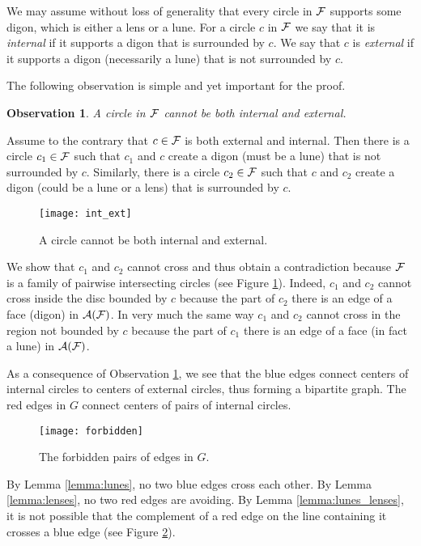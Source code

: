 \documentclass[11pt,a4paper]{article}
\newcommand{\F}{{\cal{F}}}
\newcommand{\A}{{\cal{A}}}
\newcommand{\bbox}{\vrule height7pt width4pt depth1pt}
\newtheorem{observation}{Observation}
\begin{document}
We may assume without loss of generality that every circle in $\F$ supports some digon, which is either a lens or a lune.
For a circle $c$ in $\F$ we say that it is \emph{internal} if it supports a digon that is surrounded by $c$. 
We say that $c$ is \emph{external} if it supports a digon (necessarily a lune) that is not surrounded by $c$.

The following observation is simple and yet important for the proof.

\begin{observation}\label{observation:int_ext}
A circle in $\F$ cannot be both internal and external.
\end{observation}

Assume to the contrary that $c \in \F$ is both external and internal. Then there is a circle $c_{1} \in \F$ such that $c_{1}$ and $c$ create a digon (must be a lune) that is not surrounded by $c$. Similarly, there is a circle $c_{2} \in \F$ such that $c$ and $c_{2}$ create a digon (could be a lune or a lens) that is surrounded by $c$.

\begin{figure}[ht]
	\centering
	\texttt{[image: int\_ext]}
	\caption{A circle cannot be both internal and external.}
	\label{fig:int_ext}
\end{figure}

We show that $c_{1}$ and $c_{2}$ cannot cross and thus obtain a contradiction because $\F$ is a family of pairwise intersecting circles (see Figure \ref{fig:int_ext}).
Indeed, $c_{1}$ and $c_{2}$ cannot cross inside the disc bounded by $c$ because 
the part of $c_{2}$ there is an edge of a face (digon) in $\A(\F)$. In very much the same way
$c_{1}$ and $c_{2}$ cannot cross in the region not bounded by $c$ because the part of $c_{1}$ there is an edge of a face (in fact a lune) in $\A(\F)$.
\bbox

\bigskip

As a consequence of Observation \ref{observation:int_ext}, we see that 
the blue edges connect centers of internal circles to centers of external circles, thus forming a bipartite graph. The red edges in $G$ connect centers of pairs
of internal circles.

\begin{figure}[ht]
	\centering
	\texttt{[image: forbidden]}
	\caption{The forbidden pairs of edges in $G$.}
	\label{fig:forbidden}
\end{figure}

By Lemma \ref{lemma:lunes}, no two blue edges cross each other. By Lemma \ref{lemma:lenses}, no two red edges are avoiding. By Lemma \ref{lemma:lunes_lenses}, it is not possible that the complement of a red edge on the line containing it crosses a blue edge (see Figure \ref{fig:forbidden}).
\end{document}
